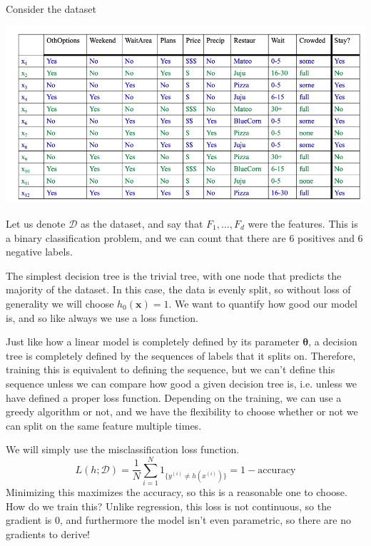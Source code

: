 \documentclass{article}
\begin{document}
    \begin{example}[Restaurant]
      Consider the dataset 
      \begin{center}
        \includegraphics[scale=0.4]{img/decision_data.png}
      \end{center}
      Let us denote $\mathcal{D}$ as the dataset, and say that $F_1, \ldots, F_d$ were the features. This is a binary classification problem, and we can count that there are $6$ positives and $6$ negative labels. 
    \end{example}

    The simplest decision tree is the trivial tree, with one node that predicts the majority of the dataset. In this case, the data is evenly split, so without loss of generality we will choose $h_0 (\mathbf{x}) = 1$. We want to quantify how good our model is, and so like always we use a loss function. 

  

    Just like how a linear model is completely defined by its parameter $\boldsymbol{\theta}$, a decision tree is completely defined by the sequences of labels that it splits on. Therefore, training this is equivalent to defining the sequence, but we can't define this sequence unless we can compare how good a given decision tree is, i.e. unless we have defined a proper loss function. Depending on the training, we can use a greedy algorithm or not, and we have the flexibility to choose whether or not we can split on the same feature multiple times. 

    \begin{definition}
      We will simply use the misclassification loss function. 
      \begin{equation}
        L(h; \mathcal{D}) = \frac{1}{N} \sum_{i=1}^N 1_{\{y^{(i)} \neq h(x^{(i)})\}} = 1 - \text{accuracy}
      \end{equation}
      Minimizing this maximizes the accuracy, so this is a reasonable one to choose. How do we train this? Unlike regression, this loss is not continuous, so the gradient is $0$, and furthermore the model isn't even parametric, so there are no gradients to derive! 
    \end{definition}
\end{document}

